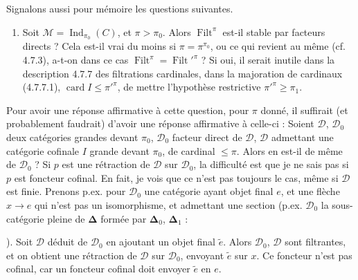 \documentclass[11pt]{article}
\newcommand{\printedpage}[1]{\marginpar{\footnotesize p.~#1}}
\newcommand{\msp}[1]{\marginpar{\footnotesize [#1]}}
\newcommand{\Filt}{\operatorname{Filt}}
\newcommand{\card}{\operatorname{card}}
\newcommand{\Ind}{\operatorname{Ind}}
\begin{document}
\msp{page 203}
Signalons aussi pour mémoire les questions suivantes.
\begin{enumerate}
\item[3)] Soit $\mathcal{M}=\Ind_{\pi_0}(C)$, et $\pi>\pi_0$. Alors $\Filt^\pi$ est-il stable par facteurs directs ? Cela est-il vrai du moins si $\pi=\pi^{\pi_0}$, ou ce qui revient au même (cf. 4.7.3), a-t-on dans ce cas $\Filt^\pi=\Filt'^{\pi}$ ? Si oui, il serait inutile dans la description 4.7.7 des filtrations cardinales, dans la majoration de cardinaux (4.7.7.1), $\card I\leqslant\pi'^{\pi}$, de mettre l'hypothèse restrictive $\pi'^{\pi}\geqslant\pi_1$.
\end{enumerate}

Pour avoir une réponse affirmative à cette question, pour $\pi$ donné, il suffirait (et probablement faudrait) d'avoir une réponse affirmative à celle-ci : Soient $\mathcal{D}$, $\mathcal{D}_0$ deux catégories grandes devant $\pi_0$, $\mathcal{D}_0$ facteur direct de $\mathcal{D}$, $\mathcal{D}$ admettant une catégorie cofinale $I$ grande devant $\pi_0$, de cardinal $\leqslant\pi$. Alors en est-il de même de $\mathcal{D}_0$ ? Si $p$ est une rétraction de $\mathcal{D}$ sur $\mathcal{D}_0$, la difficulté est que je ne sais pas si $p$ est foncteur cofinal. En fait, je vois que
\printedpage{72}
\msp{page 204}
ce n'est pas toujours le cas, même si $\mathcal{D}$ est finie. Prenons p.ex. pour $\mathcal{D}_0$ une catégorie ayant objet final $e$, et une flèche $x\longrightarrow e$ qui n'est pas un isomorphisme, et admettant une section (p.ex. $\mathcal{D}_0$ la sous-catégorie pleine de $\boldsymbol{\Delta}$ formée par $\boldsymbol{\Delta}_0$, $\boldsymbol{\Delta}_1$ :  ). Soit $\mathcal{D}$ déduit de $\mathcal{D}_0$ en ajoutant un objet final $\tilde{e}$. Alors $\mathcal{D}_0$, $\mathcal{D}$ sont filtrantes, et on obtient une rétraction de $\mathcal{D}$ sur $\mathcal{D}_0$, envoyant $\tilde{e}$ sur $x$. Ce foncteur n'est pas cofinal, car un foncteur cofinal doit envoyer $\tilde{e}$ en $e$.
\end{document}
